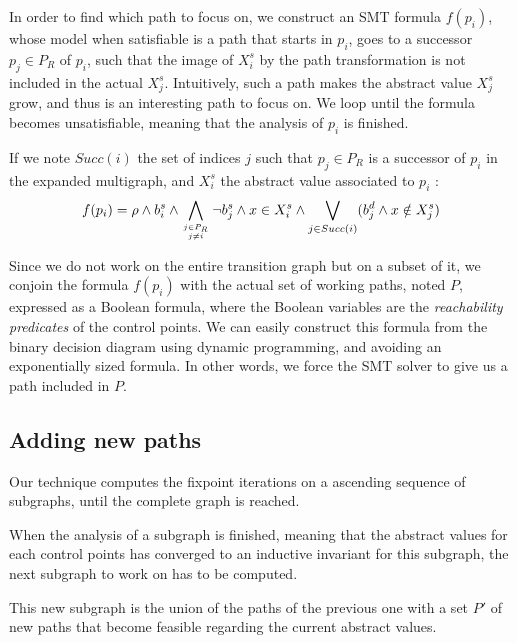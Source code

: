 \documentclass[preprint]{sigplanconf}
\begin{document}
In order to find which path to focus on, we construct an SMT formula $f(p_i)$, whose
model when satisfiable is a path that starts in $p_i$, goes to a successor $p_j
\in P_R$ of $p_i$, such that the image of $X_{i}^s$ by the path transformation
is not included in the actual $X_{j}^s$.
Intuitively, such a path makes the abstract value $X_{j}^s$ grow, and thus is
an interesting path to focus on. We loop until the formula becomes unsatisfiable,
meaning that the analysis of $p_i$ is finished.

If we note $Succ(i)$ the set of indices $j$ such that $p_j \in P_R$ is a
successor of $p_i$ in the expanded multigraph, and $X_i^s$ the abstract value
associated to $p_i$ :
$$f(p_i) = \rho \wedge b_i^s \wedge 
\displaystyle\bigwedge_{j \in P_R \atop j \neq i} \neg
b_j^s \wedge x \in X_i^s \wedge \displaystyle\bigvee_{j \in Succ(i)} (b_j^d \wedge
x \notin X_j^s)$$

Since we do not work on the entire transition graph but on a subset of it, we
conjoin the formula $f(p_i)$ with the actual set of working paths,
noted $P$, expressed as a Boolean formula, where the Boolean variables are the
\emph{reachability predicates} of the control points. We can easily construct
this formula from the binary decision diagram using dynamic programming, and
avoiding an exponentially sized formula. In other words, we force the SMT solver
to give us a path included in $P$.


\subsection{Adding new paths}
\label{subsec:addingpaths}

Our technique computes the fixpoint iterations on a ascending sequence of
subgraphs, until the complete graph is reached.

When the analysis of a subgraph is finished, meaning that the abstract values
for each control points has converged to an inductive invariant for this subgraph,
the next subgraph to work on has to be computed.

This new subgraph is the union of the paths of the previous one with a set
$P'$ of new paths that become feasible regarding the current abstract values.
\end{document}

